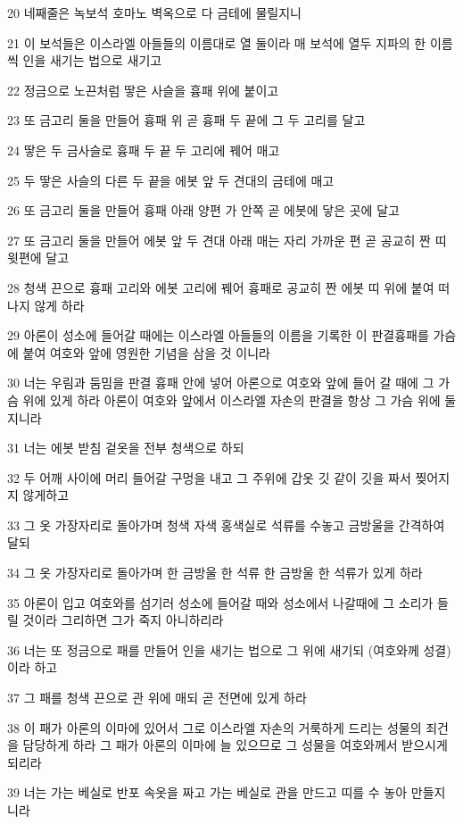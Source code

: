 \par 20 네째줄은 녹보석 호마노 벽옥으로 다 금테에 물릴지니
\par 21 이 보석들은 이스라엘 아들들의 이름대로 열 둘이라 매 보석에 열두 지파의 한 이름씩 인을 새기는 법으로 새기고
\par 22 정금으로 노끈처럼 땋은 사슬을 흉패 위에 붙이고
\par 23 또 금고리 둘을 만들어 흉패 위 곧 흉패 두 끝에 그 두 고리를 달고
\par 24 땋은 두 금사슬로 흉패 두 끝 두 고리에 꿰어 매고
\par 25 두 땋은 사슬의 다른 두 끝을 에봇 앞 두 견대의 금테에 매고
\par 26 또 금고리 둘을 만들어 흉패 아래 양편 가 안쪽 곧 에봇에 닿은 곳에 달고
\par 27 또 금고리 둘을 만들어 에봇 앞 두 견대 아래 매는 자리 가까운 편 곧 공교히 짠 띠 윗편에 달고
\par 28 청색 끈으로 흉패 고리와 에봇 고리에 꿰어 흉패로 공교히 짠 에봇 띠 위에 붙여 떠나지 않게 하라
\par 29 아론이 성소에 들어갈 때에는 이스라엘 아들들의 이름을 기록한 이 판결흉패를 가슴에 붙여 여호와 앞에 영원한 기념을 삼을 것 이니라
\par 30 너는 우림과 둠밈을 판결 흉패 안에 넣어 아론으로 여호와 앞에 들어 갈 때에 그 가슴 위에 있게 하라 아론이 여호와 앞에서 이스라엘 자손의 판결을 항상 그 가슴 위에 둘지니라
\par 31 너는 에봇 받침 겉옷을 전부 청색으로 하되
\par 32 두 어깨 사이에 머리 들어갈 구멍을 내고 그 주위에 갑옷 깃 같이 깃을 짜서 찢어지지 않게하고
\par 33 그 옷 가장자리로 돌아가며 청색 자색 홍색실로 석류를 수놓고 금방울을 간격하여 달되
\par 34 그 옷 가장자리로 돌아가며 한 금방울 한 석류 한 금방울 한 석류가 있게 하라
\par 35 아론이 입고 여호와를 섬기러 성소에 들어갈 때와 성소에서 나갈때에 그 소리가 들릴 것이라 그리하면 그가 죽지 아니하리라
\par 36 너는 또 정금으로 패를 만들어 인을 새기는 법으로 그 위에 새기되 (여호와께 성결)이라 하고
\par 37 그 패를 청색 끈으로 관 위에 매되 곧 전면에 있게 하라
\par 38 이 패가 아론의 이마에 있어서 그로 이스라엘 자손의 거룩하게 드리는 성물의 죄건을 담당하게 하라 그 패가 아론의 이마에 늘 있으므로 그 성물을 여호와께서 받으시게 되리라
\par 39 너는 가는 베실로 반포 속옷을 짜고 가는 베실로 관을 만드고 띠를 수 놓아 만들지니라
